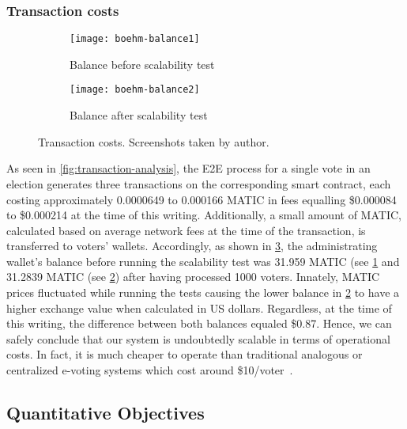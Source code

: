 \subsubsection{Transaction costs}\label{subsubsec:res-transaction-costs}

\begin{figure}[h]
    \begin{subfigure}[b]{0.5\textwidth}
        \centering
        \texttt{[image: boehm-balance1]}
        \caption{Balance before scalability test}
        \label{fig:balance-before}
    \end{subfigure}
    \begin{subfigure}[b]{0.5\textwidth}
        \centering
        \texttt{[image: boehm-balance2]}
        \caption{Balance after scalability test}
        \label{fig:balance-after}
    \end{subfigure}
    \caption{Transaction costs. Screenshots taken by author.}
    \label{fig:transaction-costs}
\end{figure}

As seen in \cref{fig:transaction-analysis}, the \gls{E2E} process for a single vote in an election generates three transactions on the corresponding smart contract, each costing approximately 0.0000649 to 0.000166 MATIC in fees equalling \$0.000084 to \$0.000214 at the time of this writing.
Additionally, a small amount of MATIC, calculated based on average network fees at the time of the transaction, is transferred to voters' wallets.
Accordingly, as shown in \cref{fig:transaction-costs}, the administrating wallet's balance before running the scalability test was 31.959 MATIC (see \cref{fig:balance-before} and 31.2839 MATIC (see \cref{fig:balance-after}) after having processed 1000 voters.
Innately, MATIC prices fluctuated while running the tests causing the lower balance in \cref{fig:balance-after} to have a higher exchange value when calculated in US dollars.
Regardless, at the time of this writing, the difference between both balances equaled \$0.87.
Hence, we can safely conclude that our system is undoubtedly scalable in terms of operational costs.
In fact, it is much cheaper to operate than traditional analogous or centralized e-voting systems which cost around \$10/voter~\autocite{mohr_how_nodate}.


\subsection{Quantitative Objectives}\label{subsec:res-quantitaive-objectives}

